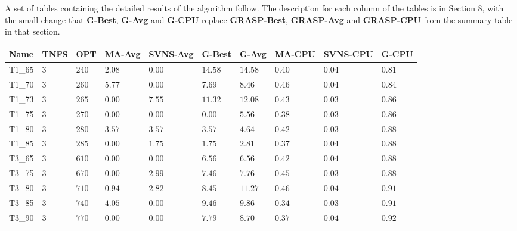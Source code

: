 A set of tables containing the detailed results of the algorithm follow. The description for each column of the tables is in Section 8, with the small change that \textbf{G-Best}, \textbf{G-Avg} and \textbf{G-CPU} replace \textbf{GRASP-Best}, \textbf{GRASP-Avg} and \textbf{GRASP-CPU} from the summary table in that section.

\begin{center}
    \begin{table}[]
    \centering
    \begin{adjustwidth}{-0.4in}{-1in}
    \begin{tabular}{|lll|l|l|ll|lll|}
\hline
Name     & TNFS   & OPT  & MA-Avg & SVNS-Avg & G-Best & G-Avg & MA-CPU & SVNS-CPU & G-CPU \\
\hline
T1\_65   & $3$    & $240$  & $2.08$   & $\bm{0.00}$     & $14.58$      & $14.58$     & $0.40$   & $0.04$     & $0.81$      \\
T1\_70   & $3$    & $260$  & $5.77$   & $\bm{0.00}$     & $7.69 $      & $8.46 $     & $0.46$   & $0.04$     & $0.84$      \\
T1\_73   & $3$    & $265$  & $\bm{0.00}$   & $7.55$     & $11.32$      & $12.08$     & $0.43$   & $0.03$     & $0.86$      \\
T1\_75   & $3$    & $270$  & $\bm{0.00}$   & $\bm{0.00}$     & $\bm{0.00} $      & $5.56 $     & $0.38$   & $0.03$     & $0.86$      \\
T1\_80   & $3$    & $280$  & $3.57$   & $3.57$     & $3.57 $      & $4.64 $     & $0.42$   & $0.03$     & $0.88$      \\
T1\_85   & $3$    & $285$  & $\bm{0.00}$   & $1.75$     & $1.75 $      & $2.81 $     & $0.37$   & $0.04$     & $0.88$      \\
\hline
T3\_65   & $3$    & $610$  & $\bm{0.00}$   & $\bm{0.00}$     & $6.56$       & $6.56 $     & $0.42$   & $0.04$     & $0.88$      \\
T3\_75   & $3$    & $670$  & $\bm{0.00}$   & $2.99$     & $7.46$       & $7.76 $     & $0.45$   & $0.03$     & $0.88$      \\
T3\_80   & $3$    & $710$  & $0.94$   & $2.82$     & $8.45$       & $11.27$     & $0.46$   & $0.04$     & $0.91$      \\
T3\_85   & $3$    & $740$  & $4.05$   & $\bm{0.00}$     & $9.46$       & $9.86 $     & $0.34$   & $0.03$     & $0.91$      \\
T3\_90   & $3$    & $770$  & $\bm{0.00}$   & $\bm{0.00}$     & $7.79$       & $8.70 $     & $0.37$   & $0.04$     & $0.92$      \\

\end{tabular}
\end{adjustwidth}
\end{table}
\end{center}
